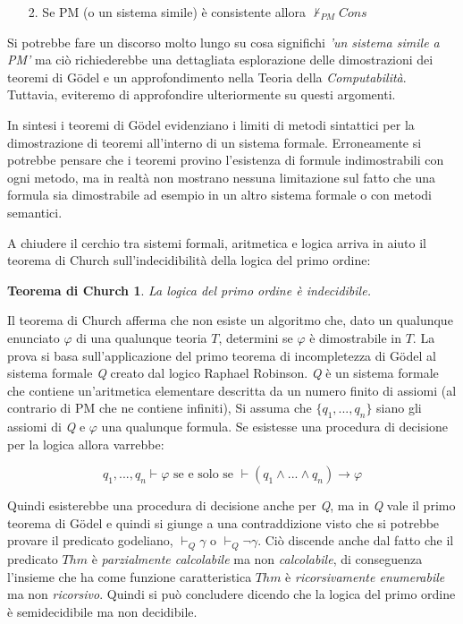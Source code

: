 \documentclass[./main.tex]{subfiles}
\begin{document}
\begin{enumerate}
  \item[2.] Se PM (o un sistema simile) è consistente allora $\nvdash_{PM} Cons$
\end{enumerate}

Si potrebbe fare un discorso molto lungo su cosa significhi \textit{'un sistema simile a PM'} ma 
ciò richiederebbe una dettagliata esplorazione delle dimostrazioni dei teoremi di
Gödel e un approfondimento nella Teoria della \textit{Computabilità}. Tuttavia, eviteremo di approfondire ulteriormente su questi argomenti.

In sintesi i teoremi di Gödel evidenziano i limiti di metodi sintattici per la dimostrazione di teoremi all'interno di un sistema formale.
Erroneamente si potrebbe pensare che i teoremi provino l'esistenza di formule indimostrabili con ogni metodo,
ma in realtà non mostrano nessuna limitazione sul fatto che una formula sia dimostrabile ad esempio in un altro sistema formale o con metodi semantici.

A chiudere il cerchio tra sistemi formali, aritmetica e logica arriva in aiuto il teorema di Church sull'indecidibilità 
della logica del primo ordine:

\newtheorem{theorem}{Teorema di Church}
\begin{theorem}
  La logica del primo ordine è indecidibile.
\end{theorem}

Il teorema di Church afferma che non esiste un algoritmo che, dato un qualunque enunciato $\varphi$ di una qualunque teoria $T$,
determini se $\varphi$ è dimostrabile in $T$.
La prova si basa sull'applicazione del primo teorema di incompletezza di Gödel al sistema formale \textit{Q}
creato dal logico Raphael Robinson. 
\textit{Q} è un sistema formale che contiene un'aritmetica elementare descritta da un numero finito di assiomi (al contrario di PM che ne contiene infiniti),
Si assuma che $\{q_1, ..., q_n\}$ siano gli assiomi di \textit{Q} e $\varphi$ una qualunque formula.
Se esistesse una procedura di decisione per la logica allora varrebbe:

$$ q_1, ..., q_n \vdash \varphi \text{ se e solo se } \vdash (q_1 \land ... \land q_n) \rightarrow \varphi$$

Quindi esisterebbe una procedura di decisione anche per \textit{Q},
ma in \textit{Q} vale il primo teorema di Gödel e quindi si giunge a una contraddizione visto che 
si potrebbe provare il predicato godeliano, $\vdash_{Q} \gamma$ o $\vdash_Q \lnot\gamma$.
Ciò discende anche dal fatto che il predicato $Thm$ è \textit{parzialmente calcolabile} ma non \textit{calcolabile},
di conseguenza l'insieme che ha come funzione caratteristica $Thm$ è \textit{ricorsivamente enumerabile} ma non \textit{ricorsivo}.
Quindi si può concludere dicendo che la logica del primo ordine è semidecidibile ma non decidibile.
\end{document}
